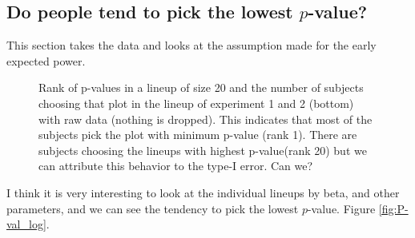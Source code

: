 \documentclass{article}
\newcommand{\green}[1]{{\color{green} #1}} %
\begin{document}
\subsection{Do people tend to pick the lowest $p$-value?}

This section takes the data and looks at the assumption made for the early expected power.

\begin{figure}[hbtp]
   \centering
       \caption{Rank of p-values in a lineup of size 20 and the number of subjects choosing that plot in the lineup of experiment 1 and 2 (bottom) with raw data (nothing is dropped). This indicates that most of the subjects pick the plot with minimum p-value (rank 1). There are subjects choosing the lineups with highest p-value(rank 20) but we can attribute this behavior to the type-I error. Can we?}
       \label{fig:P-val_rank}
\end{figure}

\green{I think it is very interesting to look at the individual lineups by beta, and other parameters, and we can see the tendency to pick the lowest $p$-value. Figure \ref{fig:P-val_log}.}
\end{document}
